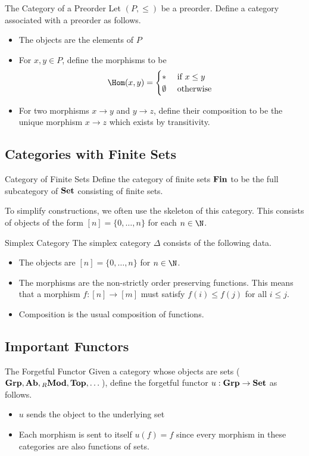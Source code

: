 \documentclass[a4paper]{article}
\begin{document}
\begin{defn}{The Category of a Preorder}{} Let $(P,\leq)$ be a preorder. Define a category associated with a preorder as follows. 
\begin{itemize}
\item The objects are the elements of $P$
\item For $x,y\in P$, define the morphisms to be $$\Hom(x,y)=\begin{cases}
\ast & \text{ if } x\leq y\\
\emptyset & \text{ otherwise }
\end{cases}$$
\item For two morphisms $x\to y$ and $y\to z$, define their composition to be the unique morphism $x\to z$ which exists by transitivity. 
\end{itemize}
\end{defn}

\subsection{Categories with Finite Sets}
\begin{defn}{Category of Finite Sets}{} Define the category of finite sets $\bold{Fin}$ to be the full subcategory of $\bold{Set}$ consisting of finite sets. 
\end{defn}

To simplify constructions, we often use the skeleton of this category. This consists of objects of the form $[n]=\{0,\dots,n\}$ for each $n\in\N$. 

\begin{defn}{Simplex Category}{} The simplex category $\Delta$ consists of the following data. 
\begin{itemize}
\item The objects are $[n]=\{0,\dots,n\}$ for $n\in\N$. 
\item The morphisms are the non-strictly order preserving functions. This means that a morphism $f:[n]\to[m]$ must satisfy $f(i)\leq f(j)$ for all $i\leq j$. 
\item Composition is the usual composition of functions. 
\end{itemize}
\end{defn}

\subsection{Important Functors}
\begin{defn}{The Forgetful Functor}{} Given a category whose objects are sets ($\bold{Grp},\bold{Ab},{_R}\bold{Mod},\bold{Top},\dots$), define the forgetful functor $u:\bold{Grp}\to\bold{Set}$ as follows. 
\begin{itemize}
\item $u$ sends the object to the underlying set
\item Each morphism is sent to itself $u(f)=f$ since every morphism in these categories are also functions of sets. 
\end{itemize}
\end{defn}
\end{document}
